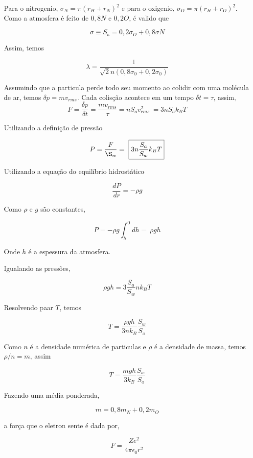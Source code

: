 \documentclass[11pt]{article}
\begin{document}
\begin{pproblem}
\begin{pssolution*}{}{}
\begin{alternativas}
    Para o nitrogenio, \(\sigma_N = \pi(r_H + r_N)^2\) e para o oxigenio, \(\sigma_O = \pi (r_H + r_O)^2\). Como a atmosfera é feito de \(0,8 N\) e \(0,2 O\), é valido que 

    \[\sigma \equiv S_a = 0,2\sigma_O + 0,8\sigma N\]

    Assim, temos 

    \[\boxed{\lambda = \frac{1}{\sqrt{2}n(0,8\sigma_0 + 0,2\sigma_0)}}\]

    \item Assumindo que a particula perde todo seu momento ao colidir com uma molécula de ar, temos \(\delta p = mv_{rms}\). Cada colisção acontece em um tempo \(\delta t =\tau\), assim, 
    \[F = \frac{\delta p }{\delta t} = \frac{mv_{rms}}{\tau} = nS_a v_{rms}^2 \  \boxed{ = 3nS_a k_BT}\]

    \item Utilizando a definição de pressão 
    
    \[P = \frac{F}{\S_w} = \ \boxed{3n\frac{S_a}{S_w}k_B T} \]

    \item Utilizando a equação do equilíbrio hidrostático 
    
    \[\frac{dP}{dr} = -\rho g\]

    Como \(\rho\) e \(g\) são constantes, 

    \[P = -\rho g \int_h^0dh= \ \boxed{\rho g h}\]

    Onde \(h\) é a espessura da atmosfera.

    \item Igualando as pressões, 

    \[\rho g h = 3\frac{S_a}{S_w}nk_BT\]

    Resolvendo paar \(T\), temos 

    \[T = \frac{\rho g h}{3nk_B}\frac{S_w}{S_a}\]

    Como \(n\) é a densidade numérica de particulas e \(\rho\) é a densidade de massa, temos \(\rho/n = m\), assim

    \[\boxed{T= \frac{m g h}{3k_B}\frac{S_w}{S_a}}\]

    \item Fazendo uma média ponderada, 
    
    \[\boxed{m = 0,8 m_N + 0,2 m_O}\]

    \item a força que o eletron sente é dada por, 
    
    \[F = \frac{Ze^2}{4\pi \epsilon_0r^2}\]


\end{alternativas}
\end{pssolution*}
\end{pproblem}
\end{document}
